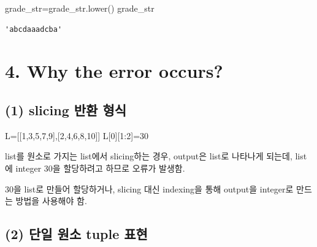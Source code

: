 \documentclass[
  letterpaper,
  DIV=11,
  numbers=noendperiod]{scrreprt}
\newenvironment{Shaded}{\begin{snugshade}}{\end{snugshade}}
\newcommand{\DecValTok}[1]{\textcolor[rgb]{0.68,0.00,0.00}{#1}}
\newcommand{\NormalTok}[1]{\textcolor[rgb]{0.00,0.23,0.31}{#1}}
\newcommand{\OperatorTok}[1]{\textcolor[rgb]{0.37,0.37,0.37}{#1}}
\begin{document}
\begin{Shaded}
\begin{Highlighting}[]
\NormalTok{grade\_str}\OperatorTok{=}\NormalTok{grade\_str.lower()}
\NormalTok{grade\_str}
\end{Highlighting}
\end{Shaded}

\begin{verbatim}
'abcdaaadcba'
\end{verbatim}

\section*{4. Why the error occurs?}\label{why-the-error-occurs-1}


\subsection*{(1) slicing 반환
형식}\label{slicing-uxbc18uxd658-uxd615uxc2dd}

\begin{Shaded}
\begin{Highlighting}[]
\NormalTok{L}\OperatorTok{=}\NormalTok{[[}\DecValTok{1}\NormalTok{,}\DecValTok{3}\NormalTok{,}\DecValTok{5}\NormalTok{,}\DecValTok{7}\NormalTok{,}\DecValTok{9}\NormalTok{],[}\DecValTok{2}\NormalTok{,}\DecValTok{4}\NormalTok{,}\DecValTok{6}\NormalTok{,}\DecValTok{8}\NormalTok{,}\DecValTok{10}\NormalTok{]]}
\NormalTok{L[}\DecValTok{0}\NormalTok{][}\DecValTok{1}\NormalTok{:}\DecValTok{2}\NormalTok{]}\OperatorTok{=}\DecValTok{30}
\end{Highlighting}
\end{Shaded}

list를 원소로 가지는 list에서 slicing하는 경우, output은 list로 나타나게
되는데, list에 integer 30을 할당하려고 하므로 오류가 발생함.

30을 list로 만들어 할당하거나, slicing 대신 indexing을 통해 output을
integer로 만드는 방법을 사용해야 함.

\subsection*{(2) 단일 원소 tuple
표현}\label{uxb2e8uxc77c-uxc6d0uxc18c-tuple-uxd45cuxd604}
\end{document}

